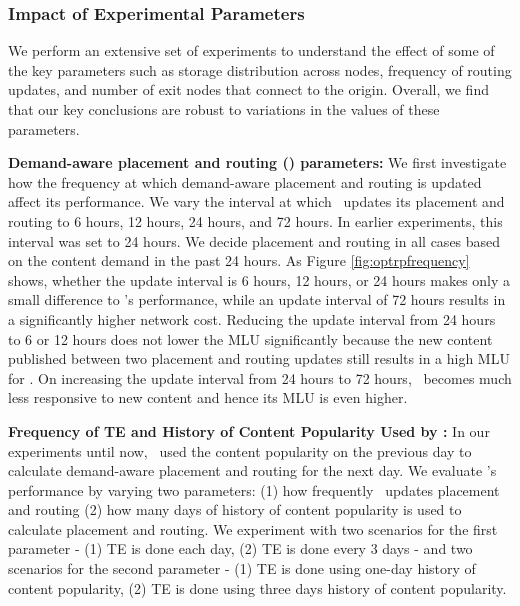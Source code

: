 \subsubsection{Impact of Experimental Parameters}
\label{sec:parameters}

We perform an extensive set of experiments to understand the effect of some of the key parameters such as storage distribution across nodes, frequency of routing updates, and number of exit nodes that connect to the origin. Overall, we find that our key conclusions are robust to variations in the values of these parameters.


\eat
{
\textbf{Demand-aware placement and routing (\optrp) parameters:}  We first investigate how the frequency at which demand-aware placement and routing is updated affect its performance.  We vary the interval at which \optrp\ updates its placement and routing to 6 hours, 12 hours, 24 hours, and 72 hours. In earlier experiments, this interval was set to 24 hours. We decide placement and routing in all cases based on the content demand in the past 24 hours. As Figure \ref{fig:optrpfrequency} shows, whether the update interval is 6 hours, 12 hours, or 24 hours makes only a small difference to \optrp's performance, while an update interval of 72 hours results in a significantly higher network cost.  Reducing the update interval from 24 hours to 6 or 12 hours does not lower the MLU  significantly because the new content published between two placement and routing updates still results in a high MLU for \optrp. On increasing the update interval from 24 hours to 72 hours, \optrp\ becomes much less responsive to new content and hence its MLU is even higher. 





\textbf{Frequency of TE and History of Content Popularity Used by \optrp:} In our experiments until now, \optrp\ used the content popularity on the previous day to calculate demand-aware placement and routing for the next day.  We evaluate \optrp's performance by varying two parameters: (1) how frequently \optrp\ updates placement and routing  (2) how many days of history of content popularity is used to calculate placement and routing.   We experiment with two scenarios for the first parameter - (1) TE is done each day, (2)  TE is done every 3 days - and two scenarios for the second parameter - (1) TE is done using one-day history of content popularity, (2) TE is done using three days history of content popularity.

}
